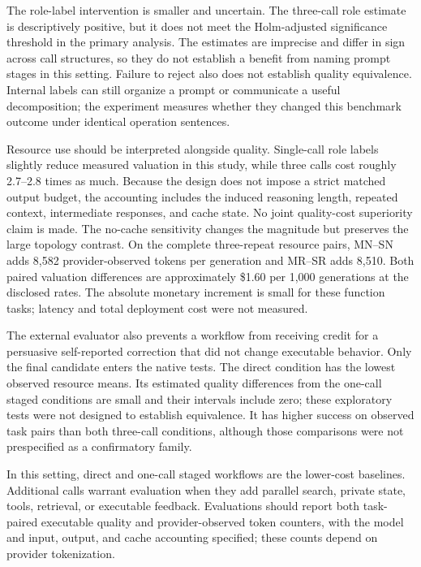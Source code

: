 \documentclass[pdflatex,sn-nature]{scientificreports}
\begin{document}
The role-label intervention is smaller and uncertain. The three-call role estimate is descriptively positive, but it does not meet the Holm-adjusted significance threshold in the primary analysis. The estimates are imprecise and differ in sign across call structures, so they do not establish a benefit from naming prompt stages in this setting. Failure to reject also does not establish quality equivalence. Internal labels can still organize a prompt or communicate a useful decomposition; the experiment measures whether they changed this benchmark outcome under identical operation sentences.

Resource use should be interpreted alongside quality. Single-call role labels slightly reduce measured valuation in this study, while three calls cost roughly 2.7--2.8 times as much. Because the design does not impose a strict matched output budget, the accounting includes the induced reasoning length, repeated context, intermediate responses, and cache state. No joint quality-cost superiority claim is made. The no-cache sensitivity changes the magnitude but preserves the large topology contrast. On the complete three-repeat resource pairs, MN--SN adds 8,582 provider-observed tokens per generation and MR--SR adds 8,510. Both paired valuation differences are approximately \$1.60 per 1,000 generations at the disclosed rates. The absolute monetary increment is small for these function tasks; latency and total deployment cost were not measured.

The external evaluator also prevents a workflow from receiving credit for a persuasive self-reported correction that did not change executable behavior. Only the final candidate enters the native tests. The direct condition has the lowest observed resource means. Its estimated quality differences from the one-call staged conditions are small and their intervals include zero; these exploratory tests were not designed to establish equivalence. It has higher success on observed task pairs than both three-call conditions, although those comparisons were not prespecified as a confirmatory family.

In this setting, direct and one-call staged workflows are the lower-cost baselines. Additional calls warrant evaluation when they add parallel search, private state, tools, retrieval, or executable feedback. Evaluations should report both task-paired executable quality and provider-observed token counters, with the model and input, output, and cache accounting specified; these counts depend on provider tokenization.
\end{document}
